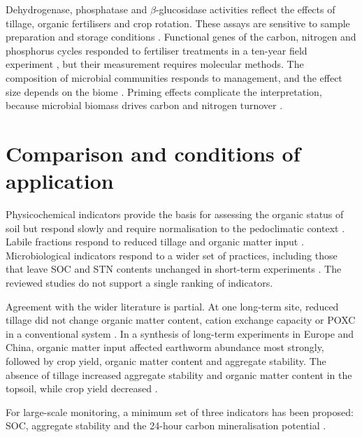 \documentclass[english]{ai4science_ysda}
\begin{document}
Dehydrogenase, phosphatase and $\beta$-glucosidase activities reflect the effects
of tillage, organic fertilisers and crop rotation. These assays are sensitive to sample preparation and storage
conditions \cite{bhupenchandra2026}. Functional genes of the carbon, nitrogen and
phosphorus cycles responded to fertiliser treatments in a ten-year field
experiment \cite{jia2025}, but their measurement requires molecular methods. The
composition of microbial communities responds to management, and the effect size
depends on the biome \cite{trivedi2016}. Priming effects complicate the
interpretation, because microbial biomass drives carbon and nitrogen turnover
\cite{kuzyakov2010}.

\section{Comparison and conditions of application}

\porozhdeno{} Physicochemical indicators provide the basis for assessing the
organic status of soil but respond slowly and require normalisation to the
pedoclimatic context \cite{feeney2024,cardoso2013}. Labile fractions respond to
reduced tillage and organic matter input \cite{bongiorno2019}. Microbiological
indicators respond to a wider set of practices, including those that leave SOC
and STN contents unchanged in short-term experiments \cite{cusset2024}. The
reviewed studies do not support a single ranking of indicators.

Agreement with the wider literature is partial. At one long-term site, reduced
tillage did not change organic matter content, cation exchange capacity or POXC
in a conventional system \cite{pearsons2023}. In a synthesis of long-term
experiments in Europe and China, organic matter input affected earthworm
abundance most strongly, followed by crop yield, organic matter content and
aggregate stability. The absence of tillage increased aggregate stability and
organic matter content in the topsoil, while crop yield decreased
\cite{bai2018}.

For large-scale monitoring, a minimum set of three indicators has been proposed:
SOC, aggregate stability and the 24-hour carbon mineralisation potential
\cite{bagnall2023}.
\end{document}
